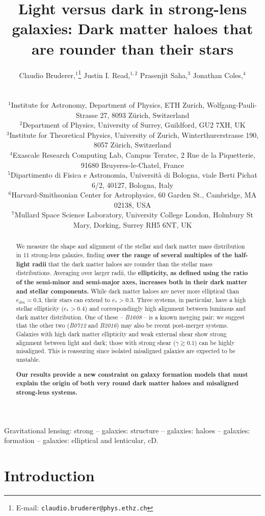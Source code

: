 \documentclass[useAMS,usenatbib]{mn2e}
\title[Light versus dark in strong-lens galaxies]{Light versus dark in strong-lens galaxies: Dark matter haloes that are rounder than their stars}
\author[Bruderer et al.]
{\parbox{\textwidth}{Claudio Bruderer,$^{1}$\thanks{E-mail: \texttt{claudio.bruderer@phys.ethz.ch}}
Justin I. Read,$^{1,2}$
Prasenjit Saha,$^{3}$
Jonathan Coles,$^{4}$
\cb{Dominik Leier,$^{5}$
Emilio E. Falco$^{6}$ and
Ignacio Ferreras$^{7}$}}\vspace{0.4cm}\\
\parbox{\textwidth}{$^{1}$Institute for Astronomy, Department of Physics, ETH Zurich, Wolfgang-Pauli-Strasse 27, 8093 Z\"urich, Switzerland\\
$^{2}$Department of Physics, University of Surrey, Guildford, GU2 7XH, UK\\
$^{3}$Institute for Theoretical Physics, University of Zurich, Winterthurerstrasse 190, 8057 Z\"urich, Switzerland\\
$^{4}$Exascale Research Computing Lab, Campus Teratec, 2 Rue de la Piquetterie, 91680 Bruyeres-le-Chatel, France\\
$^{5}$Dipartimento di Fisica e Astronomia, Universit\`{a} di Bologna, viale Berti Pichat 6/2, 40127, Bologna, Italy\\
$^{6}$Harvard-Smithsonian Center for Astrophysics, 60 Garden St., Cambridge, MA 02138, USA\\
$^{7}$Mullard Space Science Laboratory, University College London, Holmbury St Mary, Dorking, Surrey RH5 6NT, UK}}
\newcommand{\cb}[1]{{\color{red} \textbf{#1}}}
\begin{document}
\maketitle

\begin{abstract}
We measure the shape and alignment of the stellar and dark matter mass distribution in 11 strong-lens galaxies, finding \cb{over the range of several multiples of the half-light radii} that the dark matter haloes are rounder than the stellar mass distributions. Averaging over larger radii, the \cb{ellipticity, as defined using the ratio of the semi-minor and semi-major axes, increases both in their dark matter and stellar components.} While dark matter haloes are never more elliptical than $e_{dm} = 0.3$, their stars can extend to $e_* > 0.3$. Three systems, in particular, have a high stellar ellipticity ($e_* > 0.4$) and correspondingly high alignment between luminous and dark matter distribution. One of these -- {\it B1608} -- is a known merging pair; we suggest that the other two ({\it B0712} and {\it B2016}) may also be recent post-merger systems. Galaxies with high dark matter ellipticity and weak external shear show strong alignment between light and dark; those with strong shear ($\gamma \gtrsim 0.1$) can be highly misaligned. This is reassuring since isolated misaligned galaxies are expected to be unstable. 

\cb{Our results provide a new constraint on galaxy formation models that must explain the origin of both very round dark matter haloes and \cb{misaligned} strong-lens systems.}

\end{abstract}

\begin{keywords}
Gravitational lensing: strong -- galaxies: structure -- galaxies: haloes -- galaxies: formation -- galaxies: elliptical and lenticular, cD.
\end{keywords}


\section{Introduction}\label{sec:introduction}
\end{document}
